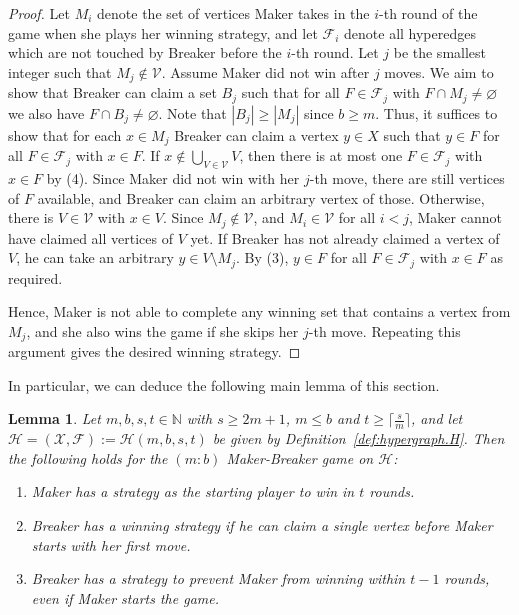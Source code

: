 \documentclass[reqno, 12pt]{amsart}
\numberwithin{equation}{section}
\numberwithin{figure}{section}
\newtheorem{lemma}[theorem]{Lemma}
\begin{document}
\begin{proof}
	Let $M_i$ denote the set of vertices Maker takes in the $i$-th round of the game when she plays her winning strategy, and let $\mathcal{F}_i$ denote all hyperedges which are not touched by Breaker before the $i$-th round. Let $j$ be the smallest integer such that $M_j \notin \mathcal{V}$. Assume Maker did not win after $j$ moves. We aim to show that 
Breaker can claim a set $B_j$ such that for all $F \in \mathcal{F}_j$ with $F \cap M_j \neq \varnothing$ we also have $F \cap B_j \neq \varnothing$. Note that $|B_j| \geq |M_j|$ since $b \geq m$. Thus, it suffices to show that for each $x \in M_j$
Breaker can claim a vertex $y \in X$  such that $y \in F$ for all $F \in \mathcal{F}_j$ with $x \in F$. If $x \notin \bigcup_{V \in \mathcal{V}} V$, then there is at most one $F \in \mathcal{F}_j$ with $x \in F$ by (4). Since Maker did not win with her $j$-th move, there are still vertices of $F$ available, and Breaker can claim an arbitrary vertex of those. Otherwise, there is $V \in \mathcal{V}$ with $x \in V$. Since $M_j \notin \mathcal{V}$, and $M_i \in \mathcal{V}$ for all $i < j$, Maker cannot have claimed all vertices of $V$ yet. If Breaker has not already claimed a vertex of $V$, he can take an arbitrary $y \in V \setminus M_j$. By (3), $y \in F$ for all $F \in \mathcal{F}_j$ with $x \in F$ as required.
	
	Hence, Maker is not able to complete any winning set that contains a vertex from $M_j$, and she also wins the game if she skips her $j$-th move. Repeating this argument gives the desired winning strategy.
\end{proof}

In particular, we can deduce the following main lemma of this section.





\begin{lemma}\label{lemma:speed.on.hypergraph}
	Let $m,b,s,t \in \mathbb{N}$ with $s \geq 2m+1$, $m \leq b$ and $t \geq \lceil \frac{s}{m} \rceil$, and let 
	$\mathcal{H} = (\mathcal{X},\mathcal{F}) := \mathcal{H}(m,b,s,t)$ be given by Definition~\ref{def:hypergraph.H}. Then the following holds for the $(m:b)$ Maker-Breaker game on $\mathcal{H}$:
	\begin{enumerate}
		\item Maker has a strategy as the starting player to win in $t$ rounds.
		\item Breaker has a winning strategy if he can claim a single vertex before Maker starts with her first move.
		\item Breaker has a strategy to prevent Maker from winning within $t-1$ rounds, even if Maker starts the game. 
	\end{enumerate}
\end{lemma}
\end{document}
